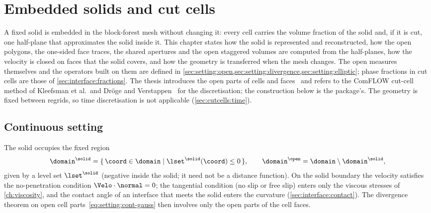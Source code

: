 \chapter{Embedded solids and cut cells}\label{ch:cutcells}
A fixed solid is embedded in the block-forest mesh without changing it: every
cell carries the volume fraction of the solid and, if it is cut, one
half-plane that approximates the solid inside it. This chapter states how the
solid is represented and reconstructed, how the open polygons, the one-sided
face traces, the shared apertures and the open staggered volumes are computed
from the half-planes, how the velocity is closed on faces that the solid
covers, and how the geometry is transferred when the mesh changes. The open
measures themselves and the operators built on them are defined in
\cref{sec:setting:open,sec:setting:divergence,sec:setting:elliptic}; phase
fractions in cut cells are those of \cref{sec:interface:fractions}. The
thesis introduces the open parts of cells and faces~ and refers
to the ComFLOW cut-cell method of Kleefsman et al.\ and Dröge and
Verstappen~\cite{verstappen2005} for the discretisation; the construction below
is the package's. The geometry is fixed between regrids, so time
discretisation is not applicable (\cref{sec:cutcells:time}).

\section{Continuous setting}\label{sec:cutcells:continuous}
The solid occupies the fixed region
\begin{equation}\label{eq:cutcells:domain}
  \domain^{\solid}=\set{\coord\in\domain}{\lset^{\solid}(\coord)\le0},\qquad
  \domain^{\open}=\domain\setminus\domain^{\solid},
\end{equation}
given by a level set $\lset^{\solid}$ (negative inside the solid; it need not
be a distance function). On the solid boundary the velocity satisfies the
no-penetration condition $\Velo\cdot\normal=0$; the tangential condition (no
slip or free slip) enters only the viscous stresses of \cref{ch:viscosity},
and the contact angle of an interface that meets the solid enters the
curvature (\cref{sec:interface:contact}). The divergence theorem on open cell
parts~\cref{eq:setting:cont-gauss} then involves only the open parts of the
cell faces.

